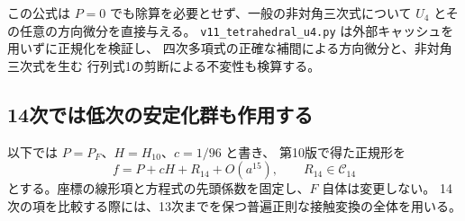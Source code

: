 この公式は $P=0$ でも除算を必要とせず、一般の非対角三次式について
$U_4$ とその任意の方向微分を直接与える。
\texttt{v11\_tetrahedral\_u4.py} は外部キャッシュを用いずに正規化を検証し、
四次多項式の正確な補間による方向微分と、非対角三次式を生む
行列式1の剪断による不変性も検算する。

\subsection{14次では低次の安定化群も作用する}
\label{subsec:v11-filtered-contact}

以下では $P=P_F$、$H=H_{10}$、$c=1/96$ と書き、
第10版で得た正規形を
\[
 f=P+cH+R_{14}+O(a^{15}),\qquad R_{14}\in\mathcal C_{14}
\]
とする。座標の線形項と方程式の先頭係数を固定し、$F$ 自体は変更しない。
14次の項を比較する際には、13次までを保つ普遍正則な接触変換の全体を用いる。

